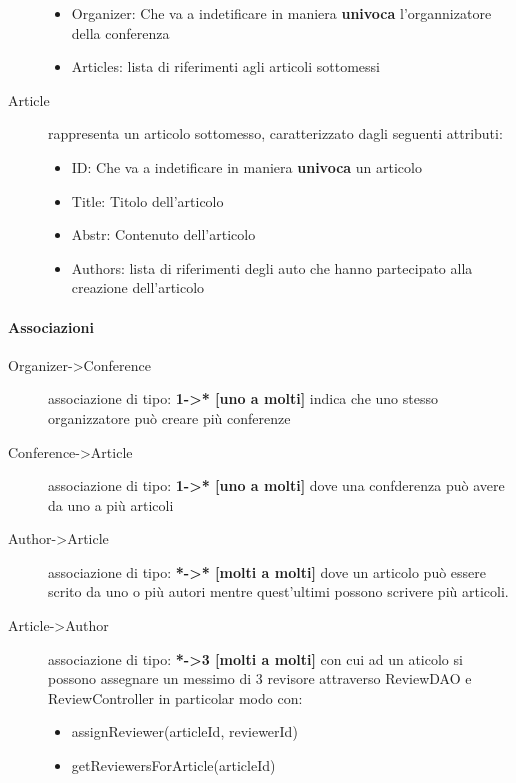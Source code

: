 \begin{description}
\begin{itemize}
\item Organizer: Che va a indetificare in maniera \textbf{univoca} l'organnizatore della conferenza
\item Articles: lista di riferimenti agli articoli sottomessi
\end{itemize}
\item [Article] rappresenta un articolo sottomesso, caratterizzato dagli seguenti attributi:
\begin{itemize}
\item ID: Che va a indetificare in maniera \textbf{univoca} un articolo
\item Title: Titolo dell'articolo
\item Abstr: Contenuto dell'articolo
\item Authors: lista di riferimenti degli auto che hanno partecipato alla creazione dell'articolo
\end{itemize}
\end{description}

\paragraph{Associazioni}
\begin{description}
\item [Organizer->Conference] associazione di tipo: \textbf{1->* [uno a molti]} indica che uno stesso organizzatore può creare più conferenze
\item [Conference->Article] associazione di tipo: \textbf{1->* [uno a molti]} dove una confderenza può avere da uno a più articoli
\item [Author->Article] associazione di tipo: \textbf{*->* [molti a molti]} dove un articolo può essere scrito da uno o più autori mentre quest'ultimi possono scrivere più articoli.
\item [Article->Author] associazione di tipo: \textbf{*->3 [molti a molti]} con cui ad un aticolo si possono assegnare un messimo di 3 revisore attraverso ReviewDAO e ReviewController in particolar modo con:
\begin{itemize}
 \item assignReviewer(articleId, reviewerId)
\item getReviewersForArticle(articleId)
\end{itemize}
\end{description}

